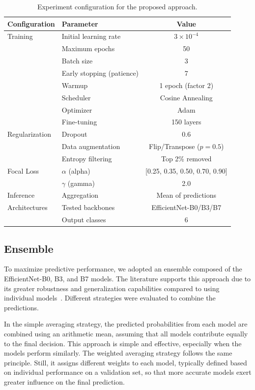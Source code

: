 \begin{table}[!ht]
	\centering
	\begin{tabular*}{\columnwidth}{@{\extracolsep\fill}llc@{}}
		\toprule
		\textbf{Configuration} & \textbf{Parameter} & \textbf{Value} \\
		\midrule
		Training & Initial learning rate & $3 \times 10^{-4}$ \\
		& Maximum epochs & 50 \\
		& Batch size & 3 \\
		& Early stopping (patience) & 7 \\
		& Warmup & 1 epoch (factor 2) \\
		& Scheduler & Cosine Annealing \\
		& Optimizer & Adam \\
		& Fine-tuning & 150 layers \\
		\midrule
		Regularization & Dropout & 0.6 \\
		& Data augmentation & Flip/Transpose ($p=0.5$) \\
		& Entropy filtering & Top 2\% removed \\
		\midrule
		Focal Loss & $\alpha$ (alpha) & [0.25, 0.35, 0.50, 0.70, 0.90] \\
		& $\gamma$ (gamma) & 2.0 \\
		\midrule
		Inference & Aggregation & Mean of predictions \\
		Architectures & Tested backbones & EfficientNet-B0/B3/B7 \\
		& Output classes & 6 \\
		\bottomrule
	\end{tabular*}
	\caption{Experiment configuration for the proposed approach.\label{tab:baseline_config}}
\end{table}



\subsection{Ensemble}
To maximize predictive performance, we adopted an ensemble composed of the EfficientNet-B0, B3, and B7 models. The literature supports this approach due to its greater robustness and generalization capabilities compared to using individual models~\cite{mian2024ensemble}. Different strategies were evaluated to combine the predictions.

In the simple averaging strategy, the predicted probabilities from each model are combined using an arithmetic mean, assuming that all models contribute equally to the final decision. This approach is simple and effective, especially when the models perform similarly. The weighted averaging strategy follows the same principle. Still, it assigns different weights to each model, typically defined based on individual performance on a validation set, so that more accurate models exert greater influence on the final prediction.

